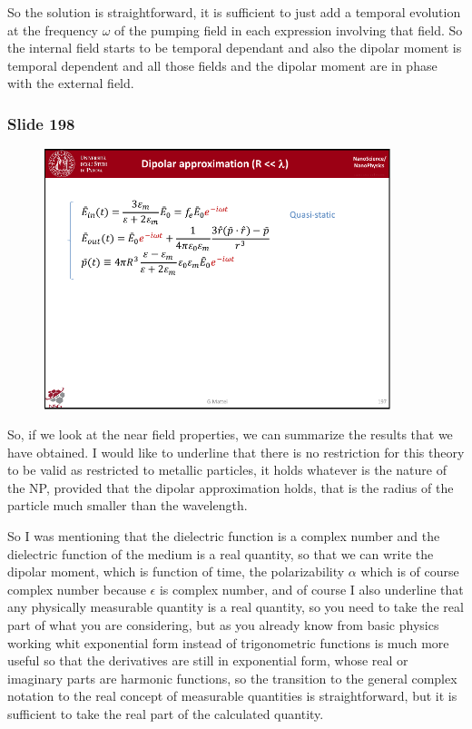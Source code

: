 \documentclass[../main/main.tex]{subfiles}
\begin{document}
So the solution is straightforward, it is sufficient to just add a temporal evolution at the frequency $\omega$ of the pumping field in each expression involving that field. So the internal field starts to be temporal dependant and also the dipolar moment is temporal dependent and all those fields and the dipolar moment are in phase with the external field.


\newpage

\subsubsection{Slide 198}

\begin{figure}[h!]
\centering
\includegraphics[page=2,width=0.9\textwidth]{../lessons/pdf_file/12_lesson.pdf}
\end{figure}

So, if we look at the near field properties, we can summarize the results that we have obtained. I would like to underline that there is no restriction for this theory to be valid as restricted to metallic particles, it holds whatever is the nature of the NP, provided that the dipolar approximation holds, that is the radius of the particle much smaller than the wavelength.

So I was mentioning that the dielectric function is a complex number and the dielectric function of the medium is a real quantity, so that we can write the dipolar moment, which is function of time, the polarizability $\alpha$ which is of course complex number because $\epsilon$ is complex number, and of course I also underline that any physically measurable quantity is a real quantity, so you need to take the real part of what you are considering, but as you already know from basic physics working whit exponential form instead of trigonometric functions is much more useful so that the derivatives are still in exponential form, whose real or imaginary parts are harmonic functions, so the transition to the general complex notation to the real concept of measurable quantities is straightforward, but it is sufficient to take the real part of the calculated quantity.
\end{document}
